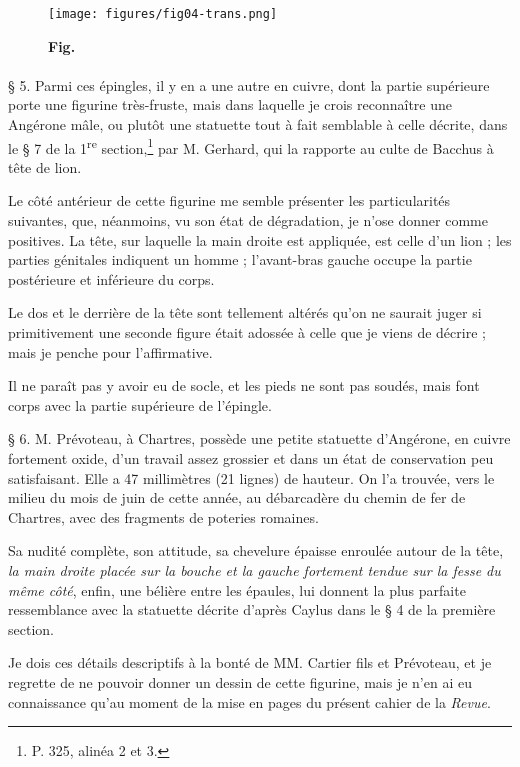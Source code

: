 \documentclass[a4paper, 11pt, oneside, polutonikogreek, french]{article}
\begin{document}
\begin{figure}[H]
\centering
\texttt{[image: figures/fig04-trans.png]}
\caption{\bfseries Fig.}
\end{figure}
\paragraph{}
§ 5. Parmi ces épingles, il y en a une autre en cuivre, dont la partie supérieure porte une figurine très-fruste, mais dans laquelle je crois reconnaître une Angérone mâle, ou plutôt une statuette tout à fait semblable à celle décrite, dans le § 7 de la 1\textsuperscript{re} section,\footnote{P. 325, alinéa 2 et 3.} par M. Gerhard, qui la rapporte au culte de Bacchus à tête de lion.

Le côté antérieur de cette figurine me semble présenter les particularités suivantes, que, néanmoins, vu son état de dégradation, je n'ose donner comme positives. La tête, sur laquelle la main droite est appliquée, est celle d'un lion ; les parties génitales indiquent un homme ; l'avant-bras gauche occupe la partie postérieure et inférieure du corps.

Le dos et le derrière de la tête sont tellement altérés qu'on ne saurait juger si primitivement une seconde figure était adossée à celle que je viens de décrire ; mais je penche pour l'affirmative.

Il ne paraît pas y avoir eu de socle, et les pieds ne sont pas soudés, mais font corps avec la partie supérieure de l'épingle.

§ 6. M. Prévoteau, à Chartres, possède une petite statuette d'Angérone, en cuivre fortement oxide, d'un travail assez grossier et dans un état de conservation peu satisfaisant. Elle a 47 millimètres (21 lignes) de hauteur. On l'a trouvée, vers le milieu du mois de juin de cette année, au débarcadère du chemin de fer de Chartres, avec des fragments de poteries romaines.

Sa nudité complète, son attitude, sa chevelure épaisse enroulée autour de la tête, \emph{la main droite placée sur la bouche et la gauche fortement tendue sur la fesse du même côté}, enfin, une bélière entre les épaules, lui donnent la plus parfaite ressemblance avec la statuette décrite d'après Caylus dans le § 4 de la première section.

Je dois ces détails descriptifs à la bonté de MM. Cartier fils et Prévoteau, et je regrette de ne pouvoir donner un dessin de cette figurine, mais je n'en ai eu connaissance qu'au moment de la mise en pages du présent cahier de la \emph{Revue}.
\end{document}
